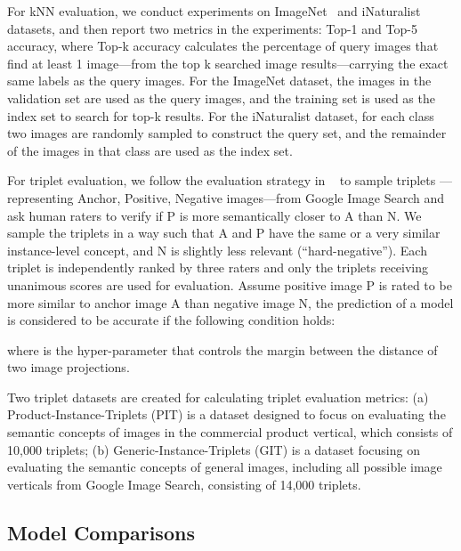 \documentclass[sigconf]{acmart}
\begin{document}
For kNN evaluation, we conduct experiments on ImageNet~\cite{krizhevsky2012imagenet} and iNaturalist~\cite{van2018inaturalist} datasets, and then report two metrics in the experiments: Top-1 and Top-5 accuracy, where Top-k accuracy calculates the percentage of query images that find at least 1 image---from the top k searched image results---carrying the exact same labels as the query images. For the ImageNet dataset, the images in the validation set are used as the query images, and the training set is used as the index set to search for top-k results. For the iNaturalist dataset, for each class two images are randomly sampled to construct the query set, and the remainder of the images in that class are used as the index set.


For triplet evaluation, we follow the evaluation strategy in ~\cite{wang2014learning} to sample triplets ---representing Anchor, Positive, Negative images---from Google Image Search and ask human raters to verify if P is more semantically closer to A than N. We sample the triplets in a way such that A and P have the same or a very similar instance-level concept, and N is slightly less relevant (``hard-negative''). Each triplet is independently ranked by three raters and only the triplets receiving unanimous scores are used for evaluation. Assume positive image P is rated to be more similar to anchor image A than negative image N, the prediction of a model is considered to be accurate if the following condition holds: 

\noindent where  is the hyper-parameter that controls the margin between the distance of two image projections.

Two triplet datasets are created for calculating triplet evaluation metrics: (a) Product-Instance-Triplets (PIT) is a dataset designed to focus on evaluating the semantic concepts of images in the commercial product vertical, which consists of 10,000 triplets; (b) Generic-Instance-Triplets (GIT) is a dataset focusing on evaluating the semantic concepts of general images, including all possible image verticals from Google Image Search, consisting of 14,000 triplets.

\subsection{Model Comparisons}
\label{subsec:Comparison Methods}
\end{document}
